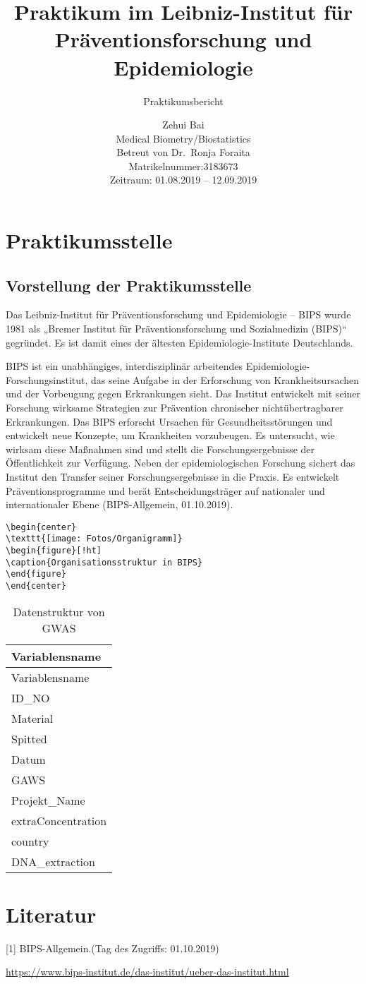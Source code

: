 \documentclass[
  10pt,
  ngerman,
]{article}
\title{Praktikum im Leibniz-Institut für Präventionsforschung und
Epidemiologie}
\subtitle{Praktikumsbericht}
\author{Zehui Bai\\
Medical Biometry/Biostatistics\\
Betreut von Dr.~Ronja Foraita\\
Matrikelnummer:3183673\\
Zeitraum: 01.08.2019 -- 12.09.2019}
\date{}
\begin{document}
\maketitle

{
\hypersetup{linkcolor=}
\setcounter{tocdepth}{2}
\tableofcontents
}
\hypertarget{praktikumsstelle}{%
\section{Praktikumsstelle}\label{praktikumsstelle}}

\hypertarget{vorstellung-der-praktikumsstelle}{%
\subsection{Vorstellung der
Praktikumsstelle}\label{vorstellung-der-praktikumsstelle}}

Das Leibniz-Institut für Präventionsforschung und Epidemiologie -- BIPS
wurde 1981 als „Bremer Institut für Präventionsforschung und
Sozialmedizin (BIPS)`` gegründet. Es ist damit eines der ältesten
Epidemiologie-Institute Deutschlands.

BIPS ist ein unabhängiges, interdisziplinär arbeitendes
Epidemiologie-Forschungsinstitut, das seine Aufgabe in der Erforschung
von Krankheitsursachen und der Vorbeugung gegen Erkrankungen sieht. Das
Institut entwickelt mit seiner Forschung wirksame Strategien zur
Prävention chronischer nichtübertragbarer Erkrankungen. Das BIPS
erforscht Ursachen für Gesundheitsstörungen und entwickelt neue
Konzepte, um Krankheiten vorzubeugen. Es untersucht, wie wirksam diese
Maßnahmen sind und stellt die Forschungsergebnisse der Öffentlichkeit
zur Verfügung. Neben der epidemiologischen Forschung sichert das
Institut den Transfer seiner Forschungsergebnisse in die Praxis. Es
entwickelt Präventionsprogramme und berät Entscheidungsträger auf
nationaler und internationaler Ebene (BIPS-Allgemein, 01.10.2019).

\begin{verbatim}
\begin{center}
\texttt{[image: Fotos/Organigramm]}
\begin{figure}[!ht]
\caption{Organisationsstruktur in BIPS}
\end{figure}
\end{center}
\end{verbatim}

\begin{longtable}[]{@{}l@{}}
\caption{Datenstruktur von GWAS}\tabularnewline
\toprule
Variablensname\tabularnewline
\midrule
\endfirsthead
\toprule
Variablensname\tabularnewline
\midrule
\endhead
ID\_NO\tabularnewline
Material\tabularnewline
Spitted\tabularnewline
Datum\tabularnewline
GAWS\tabularnewline
Projekt\_Name\tabularnewline
extraConcentration\tabularnewline
country\tabularnewline
DNA\_extraction\tabularnewline
\bottomrule
\end{longtable}

\hypertarget{literatur}{%
\section{Literatur}\label{literatur}}

{[}1{]} BIPS-Allgemein.(Tag des Zugriffs: 01.10.2019)

\url{https://www.bips-institut.de/das-institut/ueber-das-institut.html}
\end{document}
